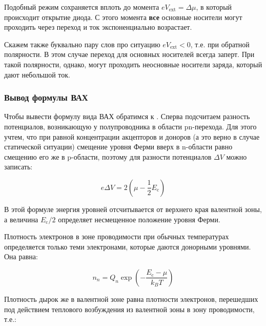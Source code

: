 \documentclass[a4paper, 12pt]{article}
\begin{document}
Подобный режим сохраняется вплоть до момента $e V_{\text{ext}} = \Delta \mu$, в который происходит открытие диода. С этого момента \textbf{все} основные носители могут проходить через переход и ток экспоненциально возрастает.

Скажем также буквально пару слов про ситуацию $e V_{\text{ext}} < 0$, т.е. при обратной полярности. В этом случае переход для основных носителей всегда заперт. При такой полярности, однако, могут проходить неосновные носители заряда, который дают небольшой ток.


\subsubsection{Вывод формулы ВАХ}

Чтобы вывести формулу вида ВАХ обратимся к \cite{Igoshin}. Сперва подсчитаем разность потенциалов, возникающую у полупроводника в области pn-перехода. Для этого учтем, что при равной концентрации акцепторов и доноров (а это верно в случае статической ситуации) смещение уровня Ферми вверх в n-области равно смещению его же в p-области, поэтому для разности потенциалов $\Delta V$ можно записать: 

\begin{equation}
	e\Delta V = 2 \left(\mu - \frac{1}{2} E_{\text{c}}\right)
\end{equation}

В этой формуле энергия уровней отсчитывается от верхнего края валентной зоны, а величина $E_{\text{c}}/2$ определяет несмещенное положение уровня Ферми.

Плотность электронов в зоне проводимости при обычных температурах определяется только теми электронами, которые даются донорными уровнями. Она равна:

\begin{equation}
	n_n = Q_n \exp\left(-\frac{E_{\text{c}} - \mu}{k_B T}\right)
\end{equation}

Плотность дырок же в валентной зоне равна плотности электронов, перешедших под действием теплового возбуждения из валентной зоны в зону проводимости, т.е.:
\end{document}
